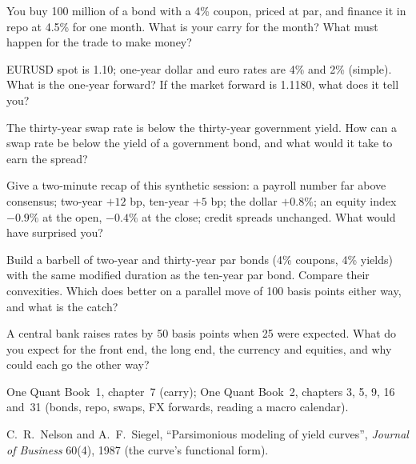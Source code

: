 \begin{interviewq}\label{iq:iv:fixed-income-and-markets:8}
You buy 100 million of a bond with a 4\% coupon, priced at par, and finance it in repo at 4.5\% for one month. What is your
carry for the month? What must happen for the trade to make money?
\end{interviewq}

\begin{interviewq}\label{iq:iv:fixed-income-and-markets:9}
EURUSD spot is 1.10; one-year dollar and euro rates are 4\% and 2\% (simple). What is the one-year forward? If the market
forward is 1.1180, what does it tell you?
\end{interviewq}

\begin{interviewq}\label{iq:iv:fixed-income-and-markets:10}
The thirty-year swap rate is below the thirty-year government yield. How can a swap rate be below the yield of a
government bond, and what would it take to earn the spread?
\end{interviewq}

\begin{interviewq}\label{iq:iv:fixed-income-and-markets:11}
Give a two-minute recap of this synthetic session: a payroll number far above consensus; two-year $+12$ bp, ten-year $+5$
bp; the dollar $+0.8\%$; an equity index $-0.9\%$ at the open, $-0.4\%$ at the close; credit spreads unchanged. What would
have surprised you?
\end{interviewq}

\begin{interviewq}\label{iq:iv:fixed-income-and-markets:12}
Build a barbell of two-year and thirty-year par bonds (4\% coupons, 4\% yields) with the same modified duration as the
ten-year par bond. Compare their convexities. Which does better on a parallel move of 100 basis points either way, and
what is the catch?
\end{interviewq}

\begin{interviewq}\label{iq:iv:fixed-income-and-markets:13}
A central bank raises rates by 50 basis points when 25 were expected. What do you expect for the front end, the long end,
the currency and equities, and why could each go the other way?
\end{interviewq}

\begin{omsources}
\item One Quant Book~1, chapter~7 (carry); One Quant Book~2, chapters 3, 5, 9, 16 and~31 (bonds, repo, swaps, FX forwards,
reading a macro calendar).
\item C.~R.~Nelson and A.~F.~Siegel, ``Parsimonious modeling of yield curves'', \emph{Journal of Business} 60(4), 1987 (the curve's
functional form).
\end{omsources}

